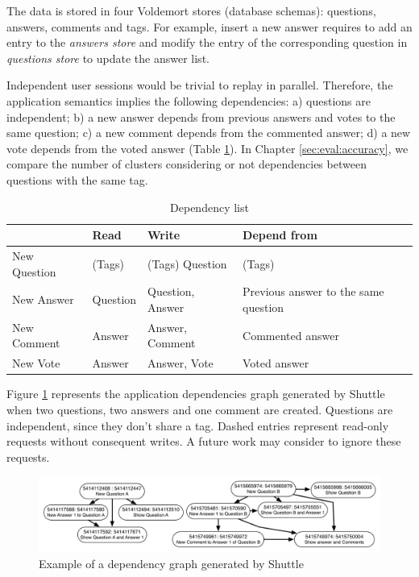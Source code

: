 The data is stored in four Voldemort stores (database schemas): questions, answers, comments and tags. For example, insert a new answer requires to add an entry to the \textit{answers store} and modify the entry of the corresponding question in \textit{questions store} to update the answer list. 

Independent user sessions would be trivial to replay in parallel. Therefore, the application semantics implies the following dependencies: a) questions are independent; b) a new answer depends from previous answers and votes to the same question; c) a new comment depends from the commented answer; d) a new vote depends from the voted answer (Table \ref{tab:dependencyTable}). In Chapter \ref{sec:eval:accuracy}, we compare the number of clusters considering or not dependencies between questions with the same tag.
\begin{table}
  \centering
   \begin{tabular}{|l|l|l|l|}
    \hline
    ~             & Read           	& Write           	& Depend from                               \\ \hline
    New Question  & (Tags)          & (Tags) Question  & (Tags)                                     \\ \hline
    New Answer    & Question        & Question, Answer & Previous answer to the same question   \\ \hline
    New Comment   & Answer          & Answer, Comment  & Commented answer                           \\ \hline
    New Vote      & Answer          & Answer, Vote     & Voted answer                               \\ \hline
    \end{tabular}
    \caption{Dependency list}
    \label{tab:dependencyTable}
\end{table}

Figure \ref{fig:dependencyGraph} represents the application dependencies graph generated by Shuttle when two questions, two answers and one comment are created. Questions are independent, since they don't share a tag. Dashed entries represent read-only requests without consequent writes. A future work may consider to ignore these requests.

\begin{figure}
  \centering
  \includegraphics[width=150mm]{images/dependencyGraph}
  \caption{Example of a dependency graph generated by Shuttle}
  \label{fig:dependencyGraph}
\end{figure}

